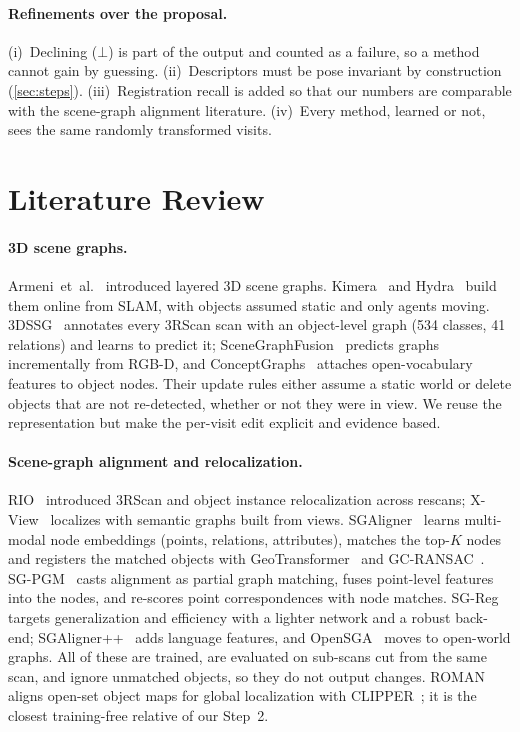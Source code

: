\documentclass[11pt, a4paper]{article}
\begin{document}
\paragraph{Refinements over the proposal.} (i)~Declining ($\bot$) is part of the output and counted as a failure, so a
method cannot gain by guessing. (ii)~Descriptors must be pose invariant by construction (\cref{sec:steps}).
(iii)~Registration recall is added so that our numbers are comparable with the scene-graph alignment literature.
(iv)~Every method, learned or not, sees the same randomly transformed visits.

\section{Literature Review}\label{sec:related}

\paragraph{3D scene graphs.} Armeni~et~al.~\cite{armeni2019scenegraph} introduced layered 3D scene graphs.
Kimera~\cite{rosinol2021kimera} and Hydra~\cite{hughes2022hydra} build them online from SLAM, with objects assumed static
and only agents moving. 3DSSG~\cite{wald2020learning} annotates every 3RScan scan with an object-level graph (534 classes,
41 relations) and learns to predict it; SceneGraphFusion~\cite{wu2021scenegraphfusion} predicts graphs incrementally from
RGB-D, and ConceptGraphs~\cite{gu2024conceptgraphs} attaches open-vocabulary features to object nodes. Their update rules
either assume a static world or delete objects that are not re-detected, whether or not they were in view. We reuse the
representation but make the per-visit edit explicit and evidence based.

\paragraph{Scene-graph alignment and relocalization.} RIO~\cite{wald2019rio} introduced 3RScan and object instance
relocalization across rescans; X-View~\cite{gawel2018xview} localizes with semantic graphs built from views.
SGAligner~\cite{sarkar2023sgaligner} learns multi-modal node embeddings (points, relations, attributes), matches the top-$K$
nodes and registers the matched objects with GeoTransformer~\cite{qin2022geotransformer} and
GC-RANSAC~\cite{barath2018gcransac}. SG-PGM~\cite{xie2024sgpgm} casts alignment as partial graph matching, fuses
point-level features into the nodes, and re-scores point correspondences with node matches. SG-Reg~\cite{liu2025sgreg}
targets generalization and efficiency with a lighter network and a robust back-end;
SGAligner++~\cite{singh2025sgalignerpp} adds language features, and OpenSGA~\cite{chen2026opensga} moves to open-world graphs. All of these are trained, are
evaluated on sub-scans cut from the same scan, and ignore unmatched objects, so they do not output changes.
ROMAN~\cite{peterson2025roman} aligns open-set object maps for global localization with CLIPPER~\cite{lusk2021clipper};
it is the closest training-free relative of our Step~2.
\end{document}
